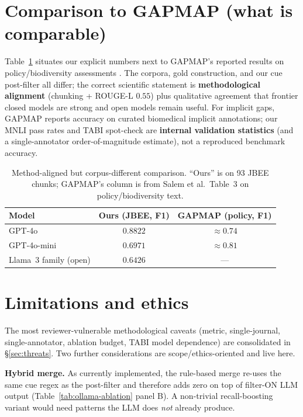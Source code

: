 \documentclass{article}
\begin{document}
\section{Comparison to GAPMAP (what is comparable)}
\label{sec:vs-gapmap}
Table~\ref{tab:gapmap-vs-ours} situates our explicit numbers next to GAPMAP's reported results on policy/biodiversity assessments \citep{salem2025gapmap,ipbes2019global}. The corpora, gold construction, and our cue post-filter all differ; the correct scientific statement is \textbf{methodological alignment} (chunking + ROUGE-L $0.55$) plus qualitative agreement that frontier closed models are strong and open models remain useful. For implicit gaps, GAPMAP reports accuracy on curated biomedical implicit annotations; our MNLI pass rates and TABI spot-check are \textbf{internal validation statistics} (and a single-annotator order-of-magnitude estimate), not a reproduced benchmark accuracy.

\begin{table}[h]
\centering
\caption{Method-aligned but corpus-different comparison. ``Ours'' is on 93 JBEE chunks; GAPMAP's column is from Salem et al.\ Table~3 on policy/biodiversity text.}
\label{tab:gapmap-vs-ours}
\begin{tabular}{lcc}
\toprule
Model & Ours (JBEE, F1) & GAPMAP (policy, F1) \\
\midrule
GPT-4o      & $0.8822$ & $\approx 0.74$ \\
GPT-4o-mini & $0.6971$ & $\approx 0.81$ \\
Llama~3 family (open) & $0.6426$ & --- \\
\bottomrule
\end{tabular}
\end{table}

\section{Limitations and ethics}
\noindent The most reviewer-vulnerable methodological caveats (metric, single-journal, single-annotator, ablation budget, TABI model dependence) are consolidated in \S\ref{sec:threats}. Two further considerations are scope/ethics-oriented and live here.

\textbf{Hybrid merge.} As currently implemented, the rule-based merge re-uses the same cue regex as the post-filter and therefore adds zero on top of filter-ON LLM output (Table~\ref{tab:ollama-ablation} panel B). A non-trivial recall-boosting variant would need patterns the LLM does \emph{not} already produce.
\end{document}
